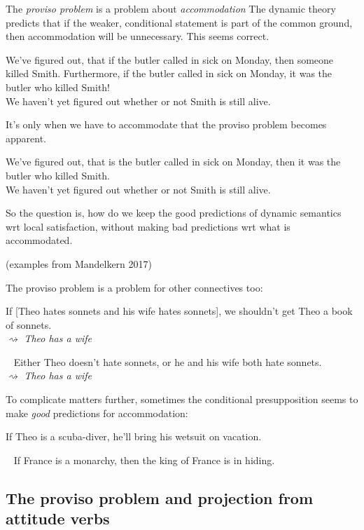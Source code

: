 \documentclass[cronos,landscape,paper=letter]{ling-handout}
\begin{document}
\begin{tcolorbox}
  The \textit{proviso problem} is a problem about \textit{accommodation}
  \tcblower
  The dynamic theory predicts that if the weaker, conditional statement is part of the common ground, then accommodation will be unnecessary. This seems correct.

  \ex
  We've figured out, that if the butler called in sick on Monday, then someone killed Smith. Furthermore, if the butler called in sick on Monday, it was the butler who killed Smith!\\
  \cmark We haven't yet figured out whether or not Smith is still alive.
  \xe

  \vspace{1ex}

  It's only when we have to accommodate that the proviso problem becomes apparent.

  \ex
  We've figured out, that is the butler called in sick on Monday, then it was the butler who killed Smith.\\
  \xmark We haven't yet figured out whether or not Smith is still alive.
  \xe

  \vspace{1ex}

  So the question is, how do we keep the good predictions of dynamic semantics wrt local satisfaction, without making bad predictions wrt what is accommodated.

  (examples from Mandelkern 2017)

\end{tcolorbox}

The proviso problem is a problem for other connectives too:

\ex
If [Theo hates sonnets and his wife hates sonnets], we shouldn't get Theo a book of sonnets.\\
\(⇝\) \textit{Theo has a wife}
\xe

\ex~
Either Theo doesn't hate sonnets, or he and his wife both hate sonnets.\\
\(⇝\) \textit{Theo has a wife}
\xe

To complicate matters further, sometimes the conditional presupposition seems to make \textit{good} predictions for accommodation:

\ex
If Theo is a scuba-diver, he'll bring his wetsuit on vacation.
\xe

\ex~
If France is a monarchy, then the king of France is in hiding.
\xe


\subsection{The proviso problem and projection from attitude verbs}
\end{document}
